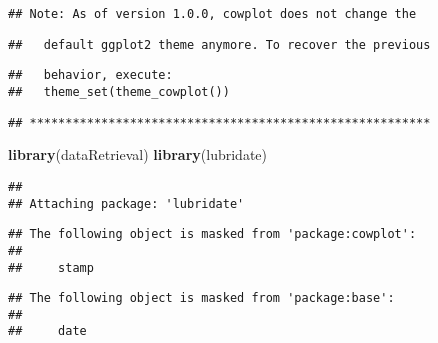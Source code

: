 \documentclass[]{article}
\newenvironment{Shaded}{\begin{snugshade}}{\end{snugshade}}
\newcommand{\KeywordTok}[1]{\textcolor[rgb]{0.13,0.29,0.53}{\textbf{#1}}}
\newcommand{\NormalTok}[1]{#1}
\begin{document}
\begin{verbatim}
## Note: As of version 1.0.0, cowplot does not change the
\end{verbatim}

\begin{verbatim}
##   default ggplot2 theme anymore. To recover the previous
\end{verbatim}

\begin{verbatim}
##   behavior, execute:
##   theme_set(theme_cowplot())
\end{verbatim}

\begin{verbatim}
## ********************************************************
\end{verbatim}

\begin{Shaded}
\begin{Highlighting}[]
\KeywordTok{library}\NormalTok{(dataRetrieval)}
\KeywordTok{library}\NormalTok{(lubridate)}
\end{Highlighting}
\end{Shaded}

\begin{verbatim}
## 
## Attaching package: 'lubridate'
\end{verbatim}

\begin{verbatim}
## The following object is masked from 'package:cowplot':
## 
##     stamp
\end{verbatim}

\begin{verbatim}
## The following object is masked from 'package:base':
## 
##     date
\end{verbatim}
\end{document}
